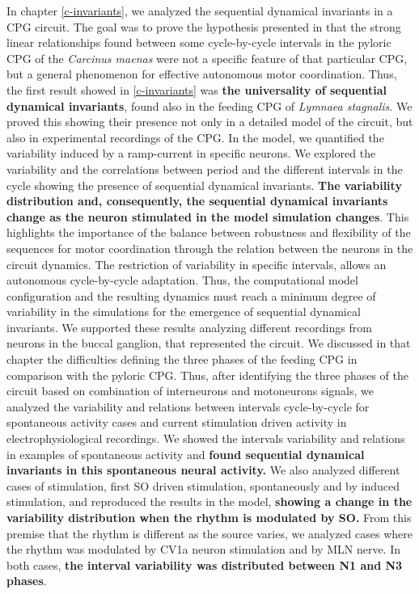 	
In chapter \ref{c-invariants}, we analyzed the sequential dynamical invariants in a CPG circuit. The goal was to prove the hypothesis presented in \textcite{elices_robust_2019} that the strong linear relationships found between some cycle-by-cycle intervals in the pyloric CPG of the \textit{Carcinus maenas} were not a specific feature of that particular CPG, but a general phenomenon for effective autonomous motor coordination. Thus, the first result showed in \ref{c-invariants} was \textbf{the universality of sequential dynamical invariants}, found also in the feeding CPG of \textit{Lymnaea stagnalis}. We proved this showing their presence not only in a detailed model of the circuit, but also in experimental recordings of the CPG. In the model, we quantified the variability induced by a ramp-current in specific neurons. We explored the variability and the correlations between period and the different intervals in the cycle showing the presence of sequential dynamical invariants.  \textbf{The variability distribution and, consequently, the sequential dynamical invariants change as the neuron stimulated in the model simulation changes}. This highlights the importance of the balance between robustness and flexibility of the sequences for motor coordination through the relation between the neurons in the circuit dynamics. The restriction of variability in specific intervals, allows an autonomous cycle-by-cycle adaptation. Thus, the computational model configuration and the resulting dynamics must reach a minimum degree of variability in the simulations for the emergence of sequential dynamical invariants. We supported these results analyzing different recordings from neurons in the buccal ganglion, that represented the circuit. We discussed in that chapter the difficulties defining the three phases of the feeding CPG in comparison with the pyloric CPG. Thus, after identifying the three phases of the circuit based on combination of interneurons and motoneurons signals, we analyzed the variability and relations between intervals cycle-by-cycle for spontaneous activity cases and current stimulation driven activity in electrophysiological recordings. We showed the intervals variability and relations in examples of spontaneous activity and \textbf{found sequential dynamical invariants in this spontaneous neural activity.} We also analyzed different cases of stimulation, first SO driven stimulation, spontaneously and by induced stimulation, and reproduced the results in the model, \textbf{showing a change in the variability distribution when the rhythm is modulated by SO.} From this premise that the rhythm is different as the source varies, we analyzed cases where the rhythm was modulated by CV1a neuron stimulation and by MLN nerve. In both cases, \textbf{the interval variability was distributed between N1 and N3 phases}.

